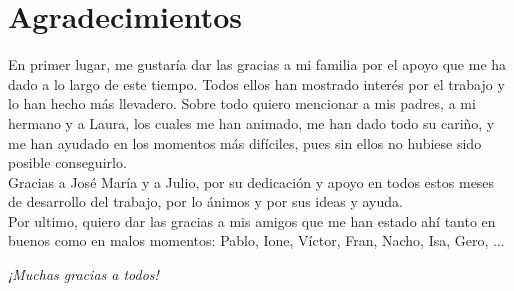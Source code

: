 \chapter*{Agradecimientos}
En primer lugar, me gustaría dar las gracias a mi familia por el apoyo que me ha dado a lo largo de este tiempo. Todos ellos han mostrado interés por el trabajo y lo han hecho más llevadero. Sobre todo quiero mencionar a mis padres, a mi hermano y a Laura, los cuales me han animado, me han dado todo su cariño, y me han ayudado en los momentos más difíciles, pues sin ellos no hubiese sido posible conseguirlo.\\

Gracias a José María y a Julio, por su dedicación y apoyo en todos estos meses de desarrollo del trabajo, por lo ánimos y por sus ideas y ayuda.\\

Por ultimo, quiero dar las gracias a mis amigos que me han estado ahí tanto en buenos como en malos momentos: Pablo, Ione, Víctor, Fran, Nacho, Isa, Gero, ...\\
\begin{flushright}
	\emph{¡Muchas gracias a todos!}
\end{flushright}